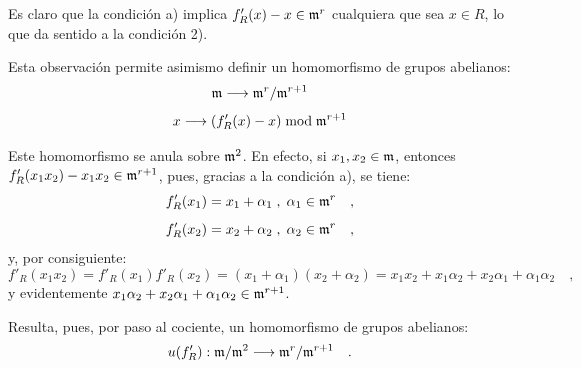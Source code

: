 Es claro que la condición a) implica $f'_R(x) - x \in \mathfrak m^r$ cualquiera que sea $x \in R$, lo que da sentido a la condición 2).

Esta observación permite asimismo definir un homomorfismo de grupos abelianos:
\[
\mathfrak m \longrightarrow \mathfrak m^r/\mathfrak m^{r+1}
\]
\[
x \longrightarrow (f'_R(x) - x) \bmod \mathfrak m^{r+1}
\]

Este homomorfismo se anula sobre $\mathfrak m^2$. En efecto, si $x_1, x_2 \in \mathfrak m$, entonces $f'_R(x_1x_2) - x_1x_2 \in \mathfrak m^{r+1}$, pues, gracias a la condición a), se tiene:
\[
f'_R(x_1) = x_1 + \alpha_1 \; , \; \alpha_1 \in \mathfrak m^r \quad ,
\]
\[
f'_R(x_2) = x_2 + \alpha_2 \; , \; \alpha_2 \in \mathfrak m^r \quad ,
\]
y, por consiguiente:
\[
f'_R(x_1x_2) = f'_R(x_1)f'_R(x_2) = (x_1 + \alpha_1)(x_2 + \alpha_2) = x_1x_2 + x_1\alpha_2 + x_2\alpha_1 + \alpha_1\alpha_2 \quad ,
\]
y evidentemente $x_1\alpha_2 + x_2\alpha_1 + \alpha_1\alpha_2 \in \mathfrak m^{r+1}$.

Resulta, pues, por paso al cociente, un homomorfismo de grupos abelianos:
\[
u(f'_R) : \mathfrak m/\mathfrak m^2 \longrightarrow \mathfrak m^r/\mathfrak m^{r+1} \quad .
\]
